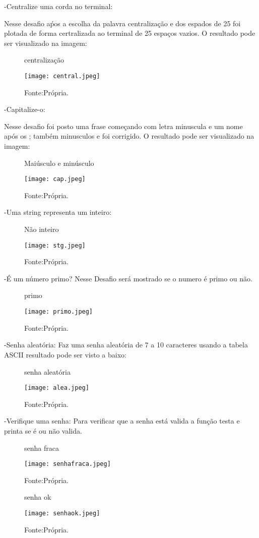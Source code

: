 -Centralize uma corda no terminal:

Nesse desafio aṕos a escolha da palavra centralização e dos espados de 25 foi plotada de forma certralizada ao terminal de 25 espaços vazios.
O resultado pode ser visualizado na imagem:
\begin{figure} [h!]	
    \centering
    \caption{centralização}
    \texttt{[image: central.jpeg]}
    \caption*{Fonte:Própria.}
    \label{fig:centralizar}
\end{figure}

-Capitalize-o:

Nesse desafio foi posto uma frase começando com letra minuscula e um nome após os ; também minusculos e foi corrigido.
O resultado pode ser visualizado na imagem:
\begin{figure} [h!]	
    \centering
    \caption{Maiúsculo e minúsculo}
    \texttt{[image: cap.jpeg]}
    \caption*{Fonte:Própria.}
    \label{fig:cap}
\end{figure}

-Uma string representa um inteiro:

\begin{figure} [h!]	
    \centering
    \caption{Não inteiro}
    \texttt{[image: stg.jpeg]}
    \caption*{Fonte:Própria.}
    \label{fig:stg}
\end{figure}

-É um número primo?
Nesse Desafio será mostrado se o numero é primo ou não.

\begin{figure} [h!]	
    \centering
    \caption{primo}
    \texttt{[image: primo.jpeg]}
    \caption*{Fonte:Própria.}
    \label{fig:primo}
\end{figure}

-Senha aleatória:
Faz uma senha aleatória de 7 a 10 caracteres usando a tabela ASCII
resultado pode ser visto a baixo:
\begin{figure} [h!]	
    \centering
    \caption{senha aleatória}
    \texttt{[image: alea.jpeg]}
    \caption*{Fonte:Própria.}
    \label{fig:senhaaleatoria}
\end{figure}

-Verifique uma senha:
Para verificar que a senha está valida a função testa e printa se é ou não valida.
\begin{figure} [h!]	
    \centering
    \caption{senha fraca}
    \texttt{[image: senhafraca.jpeg]}
    \caption*{Fonte:Própria.}
    \label{fig:senhafraca}
\end{figure}
\begin{figure} [h!]	
    \centering
    \caption{senha ok}
    \texttt{[image: senhaok.jpeg]}
    \caption*{Fonte:Própria.}
    \label{fig:senhaok}
\end{figure}

